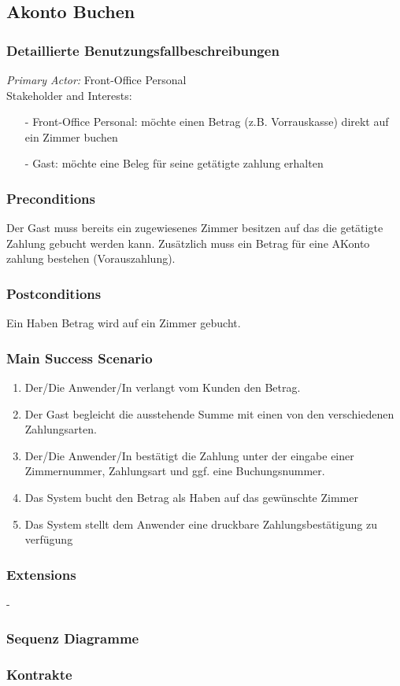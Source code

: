 \documentclass[./detailed_overview_usecases.tex]{subfiles}
\begin{document}
    \subsection{Akonto Buchen}
    \subsubsection{Detaillierte Benutzungsfallbeschreibungen}
    \textit{Primary Actor:}
    Front-Office Personal
    \\
    Stakeholder and Interests:
    \begin{itemize}
        \item[-] Front-Office Personal: möchte einen Betrag (z.B. Vorrauskasse) direkt auf ein Zimmer buchen
        \item[-] Gast: möchte eine Beleg für seine getätigte zahlung erhalten
    \end{itemize}

    \subsubsection*{Preconditions}
    Der Gast muss bereits ein zugewiesenes Zimmer besitzen auf das die getätigte Zahlung gebucht werden kann.
    Zusätzlich muss ein Betrag für eine AKonto zahlung bestehen (Vorauszahlung).

    \subsubsection*{Postconditions}
    Ein Haben Betrag wird auf ein Zimmer gebucht.

    \subsubsection*{Main Success Scenario}
    \begin{enumerate}
        \item Der/Die Anwender/In verlangt vom Kunden den Betrag.
        \item Der Gast begleicht die ausstehende Summe mit einen von den verschiedenen Zahlungsarten.
        \item Der/Die Anwender/In bestätigt die Zahlung unter der eingabe einer
        Zimmernummer, Zahlungsart und ggf. eine Buchungsnummer.
        \item Das System bucht den Betrag als Haben auf das gewünschte Zimmer
        \item Das System stellt dem Anwender eine druckbare Zahlungsbestätigung zu verfügung
    \end{enumerate}

    \subsubsection*{Extensions}
    -

    \subsubsection{Sequenz Diagramme}
    \subsubsection{Kontrakte}
\end{document}
